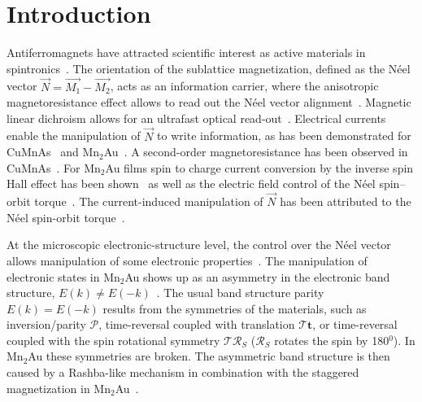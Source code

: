 \documentclass[aps,prb,twocolumn,superscriptaddress,10pt]{revtex4-1}
\begin{document}
\section{Introduction} 
Antiferromagnets have attracted scientific interest as active materials in 
spintronics~\cite{Jungwirth2016, Gomonay2017,Baltz2018}.
The orientation of the sublattice magnetization, defined as the N{\'e}el vector $\vec{N}=\vec{M_1}-\vec{M_2}$, acts as an information carrier, where
the anisotropic magnetoresistance effect allows to read out 
the N{\'e}el vector alignment~\cite{Reimers2023}.
Magnetic linear dichroism allows for an ultrafast optical read-out~\cite{Grigorev2021}. 
Electrical currents enable the manipulation of $\vec{N}$ to write information, as has been demonstrated for 
CuMnAs~\cite{Zelezny2014,Wadley2016,Grzybowski2017,Wadley2018} and Mn$_2$Au~\cite{Bodnar2018,Meinert2018,Reimers2023}.  %
A second-order magnetoresistance has been observed in CuMnAs~\cite{Godinho2018}.
For Mn$_2$Au films spin to charge current conversion by the inverse spin Hall effect
has been shown~\cite{Arana2018} as well as the
electric field control of the N{\'e}el spin–orbit torque~\cite{Chen2019}.
The current-induced manipulation of $\vec{N}$ has been attributed to
the N{\'e}el spin-orbit torque~\cite{Gomonay2017}.

At the microscopic electronic-structure level, 
the control over the N{\'e}el vector allows manipulation of some electronic properties~\cite{Linn2023}.
The manipulation of electronic states in Mn$_2$Au
shows up as an asymmetry in the electronic band structure, $E(k) \neq E(-k)$~\cite{Fedchenko2022}.
The usual band structure parity $E(k) = E(-k)$ results from the symmetries of the materials, such as inversion/parity $\mathcal{P}$, time-reversal coupled with translation $\mathcal{T}\boldsymbol{t}$, or
time-reversal coupled with the spin rotational symmetry $\mathcal{TR}_{S}$
($\mathcal{R}_S$ rotates the spin by 180$^0$). 
In Mn$_2$Au these symmetries are broken.
The asymmetric band structure is then caused by
a Rashba-like mechanism in combination with the staggered magnetization in Mn$_2$Au~\cite{Smejkal2017,Smejkal2017b}. 



\end{document}
